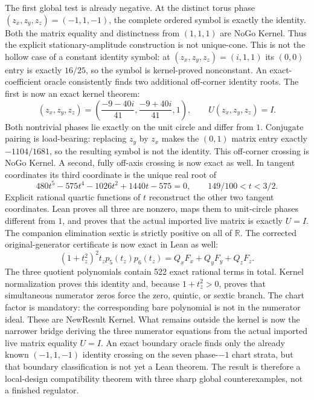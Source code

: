 \documentclass[11pt]{article}
\begin{document}
The first global test is already negative.  At the distinct torus phase
$(z_x,z_y,z_z)=(-1,1,-1)$, the complete ordered symbol is exactly the identity.
Both the matrix equality and distinctness from $(1,1,1)$ are NoGo{}
Kernel{}.  Thus the explicit stationary-amplitude construction is not
unique-cone.  This is not the hollow case of a constant identity symbol: at
$(z_x,z_y,z_z)=(i,1,1)$ its $(0,0)$ entry is exactly $16/25$, so the symbol is
kernel-proved nonconstant.  An exact-coefficient oracle consistently finds two
additional off-corner identity roots.  The first is now an exact kernel
theorem:
\[
 (z_x,z_y,z_z)=
 \left(\frac{-9-40i}{41},\frac{-9+40i}{41},1\right),
 \qquad U(z_x,z_y,z_z)=I.
\]
Both nontrivial phases lie exactly on the unit circle and differ from $1$.
Conjugate pairing is load-bearing: replacing $z_y$ by $z_x$ makes the
$(0,1)$ matrix entry exactly $-1104/1681$, so the resulting symbol is not the
identity.  This off-corner crossing is NoGo{} Kernel{}.  A second, fully
off-axis crossing is now exact as well.  In tangent coordinates its third
coordinate is the unique real root of
\[
  480t^5-575t^4-1026t^2+1440t-575=0,
  \qquad 149/100<t<3/2.
\]
Explicit rational quartic functions of $t$ reconstruct the other two tangent
coordinates.  Lean proves all three are nonzero, maps them to unit-circle
phases different from $1$, and proves that the actual imported live matrix is
exactly $U=I$.  The companion elimination sextic is strictly positive on all
of $\mathbb R$.  The corrected original-generator certificate is now exact in
Lean as well:
\[
 (1+t_z^2)^2 t_z p_5(t_z)p_6(t_z)
   =Q_xF_x+Q_yF_y+Q_zF_z.
\]
The three quotient polynomials contain 522 exact rational terms in total.
Kernel normalization proves this identity and, because $1+t_z^2>0$, proves
that simultaneous numerator zeros force the zero, quintic, or sextic branch.
The chart factor is mandatory: the corresponding bare polynomial is not in
the numerator ideal.  These are NewResult{} Kernel{}.  What remains outside
the kernel is now the narrower bridge deriving the three numerator equations
from the actual imported live matrix equality $U=I$.  An exact boundary oracle finds only the already
known $(-1,1,-1)$ identity crossing on the seven phase-$-1$ chart strata, but
that boundary classification is not yet a Lean theorem.  The result is
therefore a local-design compatibility theorem with three sharp global
counterexamples, not a finished regulator.
\end{document}
